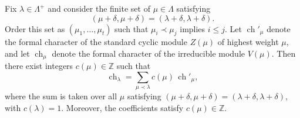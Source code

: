 Fix $\lambda \in \Lambda^+$ and consider the finite set of $\mu \in \Lambda$ satisfying
$$
(\mu + \delta, \mu + \delta) = (\lambda + \delta, \lambda + \delta).
$$
Order this set as $(\mu_1, \ldots, \mu_t)$ such that $\mu_i \prec \mu_j$ implies $i \leq j$. Let $\operatorname{ch}'_{\mu}$ denote the formal character of the standard cyclic module $Z(\mu)$ of highest weight $\mu$, and let $\operatorname{ch}_{\mu}$ denote the formal character of the irreducible module $V(\mu)$. Then there exist integers $c(\mu) \in \mathbb{Z}$ such that
$$
\operatorname{ch}_{\lambda} = \sum_{\mu \prec \lambda} c(\mu) \, \operatorname{ch}'_{\mu},
$$
where the sum is taken over all $\mu$ satisfying $(\mu + \delta, \mu + \delta) = (\lambda + \delta, \lambda + \delta)$, with $c(\lambda) = 1$. Moreover, the coefficients satisfy $c(\mu) \in \mathbb{Z}$.
